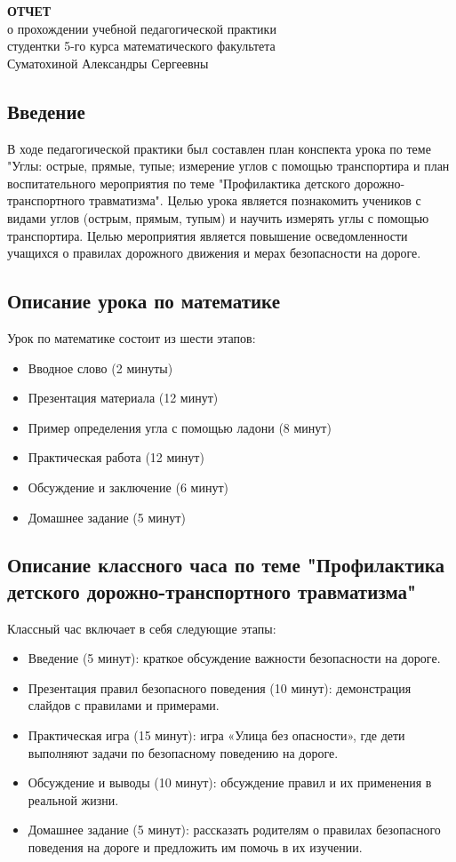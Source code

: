 \documentclass[a4paper,12pt]{article}
\begin{document}
\begin{center}
\textbf{ОТЧЕТ}\\
о прохождении учебной педагогической практики\\
студентки 5-го курса математического факультета\\
Суматохиной Александры Сергеевны
\end{center}

\subsection*{Введение}

В ходе педагогической практики был составлен план конспекта урока по теме "Углы: острые, прямые, тупые; измерение углов с помощью транспортира и план воспитательного мероприятия по теме "Профилактика детского дорожно-транспортного травматизма". Целью урока является познакомить учеников с видами углов (острым, прямым, тупым) и научить измерять углы с помощью транспортира. Целью мероприятия является повышение осведомленности учащихся о правилах дорожного движения и мерах безопасности на дороге.

\subsection*{Описание урока по математике}
Урок по математике состоит из шести этапов:
\begin{itemize}
    \item Вводное слово (2 минуты)
    \item Презентация материала (12 минут)
    \item Пример определения угла с помощью ладони (8 минут)
    \item Практическая работа (12 минут)
    \item Обсуждение и заключение (6 минут)
    \item Домашнее задание (5 минут)
\end{itemize}

\subsection*{Описание классного часа по теме "Профилактика детского дорожно-транспортного травматизма"}
Классный час включает в себя следующие этапы:
\begin{itemize}
    \item Введение (5 минут): краткое обсуждение важности безопасности на дороге.
    \item Презентация правил безопасного поведения (10 минут): демонстрация слайдов с правилами и примерами.
    \item Практическая игра (15 минут): игра «Улица без опасности», где дети выполняют задачи по безопасному поведению на дороге.
    \item Обсуждение и выводы (10 минут): обсуждение правил и их применения в реальной жизни.
    \item Домашнее задание (5 минут): рассказать родителям о правилах безопасного поведения на дороге и предложить им помочь в их изучении.
\end{itemize}
\end{document}
